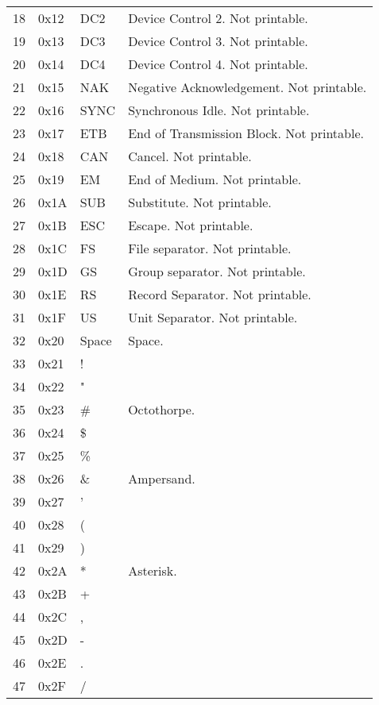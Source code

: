 \documentclass[11pt,fleqn]{book} %
\begin{document}
\begin{table}[]
\begin{tabular}{|l|l|l|l|}
18            & 0x12      & DC2       & Device Control 2.  Not printable. \\
19            & 0x13      & DC3       & Device Control 3.  Not printable. \\
20            & 0x14      & DC4       & Device Control 4.  Not printable. \\
21            & 0x15      & NAK       & Negative Acknowledgement.  Not printable. \\
22            & 0x16      & SYNC      & Synchronous Idle.  Not printable. \\
23            & 0x17      & ETB       & End of Transmission Block.  Not printable. \\
24            & 0x18      & CAN       & Cancel.  Not printable. \\
25            & 0x19      & EM        & End of Medium.  Not printable.\\
26            & 0x1A      & SUB       & Substitute. Not printable. \\
27            & 0x1B      & ESC       & Escape.  Not printable. \\
28            & 0x1C      & FS        & File separator.  Not printable. \\
29            & 0x1D      & GS        & Group separator.  Not printable. \\
30            & 0x1E      & RS        & Record Separator.  Not printable. \\
31            & 0x1F      & US        & Unit Separator.  Not printable. \\
32            & 0x20      & Space     & Space. \\
33            & 0x21      & !         & \\
34            & 0x22      & "         & \\
35            & 0x23      & \#         & Octothorpe. \\
36            & 0x24      & \$         & \\
37            & 0x25      & \%         & \\
38            & 0x26      & \&         & Ampersand. \\
39            & 0x27      & '          & \\
40            & 0x28      & (          & \\
41            & 0x29      & )          & \\
42            & 0x2A      & *          & Asterisk. \\
43            & 0x2B      & +          & \\
44            & 0x2C      & ,          & \\
45            & 0x2D      & -          & \\
46            & 0x2E      & .          & \\
47            & 0x2F      & /          & \\
\hline

\end{tabular}
\end{table}
\end{document}
